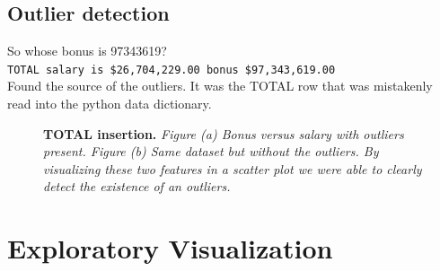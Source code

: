 \documentclass[twoside,openright,titlepage,numbers=noenddot,headinclude,%
               footinclude=true,cleardoublepage=empty,abstractoff,BCOR=5mm,%
               paper=a4,fontsize=11pt,ngerman,american]{scrreprt}
\numberwithin{theorem}{chapter}
\numberwithin{definition}{chapter}
\numberwithin{algorithm}{chapter}
\numberwithin{figure}{chapter}
\numberwithin{table}{chapter}
\numberwithin{equation}{chapter}
\begin{document}
\begin{itemize}%
\subsection*{Outlier detection}
So whose bonus is 97343619?\\
\texttt{TOTAL salary is  \$26,704,229.00 bonus \$97,343,619.00}\\
Found the source of the outliers. It was the TOTAL row that was mistakenly read into the python data dictionary.
\begin{figure}[!hbtp]
\centering
    
    \caption{\textbf{TOTAL insertion.} \textit{Figure (a) Bonus versus salary with outliers present. Figure (b) Same dataset but without the outliers. By visualizing these two features in a scatter plot we were able to clearly detect the existence of an outliers.}}
\end{figure}




\section*{Exploratory Visualization}


\end{itemize}
\end{document}
